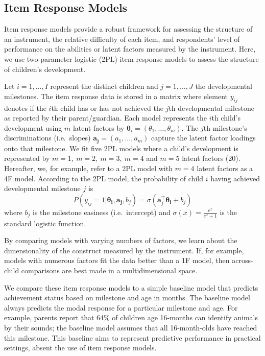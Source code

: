 \documentclass[man]{apa7}
\begin{document}
\hypertarget{item-response-models}{%
\subsection*{Item Response Models}\label{item-response-models}}

Item response models provide a robust framework for
assessing the structure of an instrument, the relative difficulty of
each item, and respondents' level of performance on the abilities or
latent factors measured by the instrument. Here, we use
two-parameter logistic (2PL) item response models to assess the
structure of children's development.

Let \(i = 1, \ldots, I\) represent the distinct children and
\(j = 1, \ldots, J\) the developmental milestones. The item response
data is stored in a matrix where element \(y_{ij}\) denotes if the
\(i\)th child has or has not achieved the \(j\)th developmental
milestone as reported by their parent/guardian. Each model represents
the \(i\)th child's development using \(m\) latent factors by
\(\boldsymbol{\theta}_{i}=(\theta_1, \dots, \theta_m)\). The \(j\)th
milestone's discriminations (i.e.~slopes)
\(\boldsymbol{a_j}=(a_1, \dots, a_m)\) capture the latent factor
loadings onto that milestone. We fit five 2PL models where a child's
development is represented by \(m = 1, \ m = 2, \ m = 3, \ m = 4\) and
\(m = 5\) latent factors (20). Hereafter, we, for example, refer to a
2PL model with \(m = 4\) latent factors as a 4F model. According to the
2PL model, the probability of child \(i\) having achieved  developmental
milestone \(j\) is \begin{equation}
P(y_{ij} = 1 | \boldsymbol{\theta_i}, \boldsymbol{a_j}, b_j) = \sigma(\boldsymbol{a}_{j}^{\top}\boldsymbol{\theta_i} + b_j)
\end{equation} where \(b_j\) is the milestone easiness (i.e.~intercept)
and \(\sigma(x) = \frac{e^x}{e^x + 1}\) is the standard logistic
function. 

By comparing models with varying numbers of factors, we learn about the
dimensionality of the construct measured by the instrument. If, for
example, models with numerous factors fit the data better than a 1F
model, then across-child comparisons are best made in a multidimensional
space.

We compare these item response models to a simple baseline
model that predicts achievement status based on milestone and age in
months. The baseline model always predicts the modal response for a particular milestone and age. For example, parents
report that 64\% of children age 16-months can identify animals by their sounds; the baseline model assumes that all 16-month-olds have reached this
milestone. This baseline aims to represent predictive performance in practical settings,
absent the use of item response models.
\end{document}
